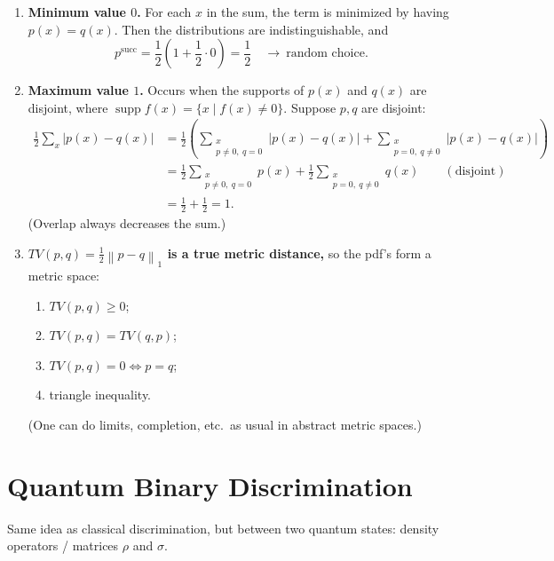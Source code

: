 \documentclass[11pt]{article}
\newcommand{\supp}{\operatorname{supp}}
\newcommand{\onenorm}[1]{\left\lVert #1 \right\rVert_{1}}
\begin{document}
\begin{enumerate}[label=\textbf{\arabic*.}, leftmargin=*]
\item \textbf{Minimum value $0$.}
For each $x$ in the sum, the term is minimized by having $p(x)=q(x)$. Then the
distributions are indistinguishable, and
\[
p^{\mathrm{succ}} = \frac12\!\left(1 + \frac12\cdot 0\right) = \frac12
\quad\rightarrow\ \text{random choice.}
\]

\item \textbf{Maximum value $1$.}
Occurs when the supports of $p(x)$ and $q(x)$ are disjoint, where
$\supp f(x)=\{x\mid f(x)\neq 0\}$. Suppose $p,q$ are disjoint:
\begin{align*}
\frac12\sum_{x}|p(x)-q(x)|
&= \frac12\!\left(
\sum_{\substack{x\\ p\neq 0,\ q=0}}|p(x)-q(x)|
+ \sum_{\substack{x\\ p=0,\ q\neq 0}}|p(x)-q(x)|
\right)\\
&= \frac12\sum_{\substack{x\\ p\neq 0,\ q=0}} p(x)
+ \frac12\sum_{\substack{x\\ p=0,\ q\neq 0}} q(x)
\qquad(\text{disjoint})\\
&= \frac12 + \frac12 = 1.
\end{align*}
(Overlap always decreases the sum.)

\item \textbf{$TV(p,q)=\tfrac12\onenorm{p-q}$ is a true metric distance,} so
the pdf's form a metric space:
\begin{enumerate}[label=(\roman*), nosep]
  \item $TV(p,q)\ge 0$;
  \item $TV(p,q)=TV(q,p)$;
  \item $TV(p,q)=0 \iff p=q$;
  \item triangle inequality.
\end{enumerate}
(One can do limits, completion, etc.\ as usual in abstract metric spaces.)
\end{enumerate}

\section{Quantum Binary Discrimination}

Same idea as classical discrimination, but between two quantum states:
density operators / matrices $\rho$ and $\sigma$.
\end{document}
